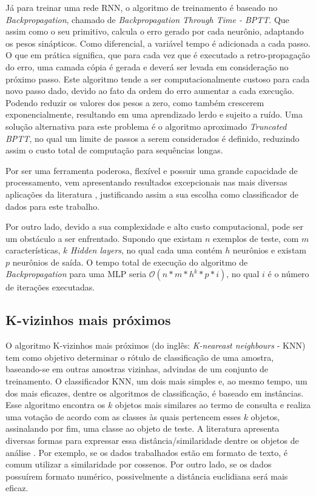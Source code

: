 Já para treinar uma rede RNN, o algoritmo de treinamento é baseado no \textit{Backpropagation}, chamado de \textit{Backpropagation Through Time - BPTT}. Que assim como o seu primitivo, calcula o erro gerado por cada neurônio, adaptando os pesos sinápticos. Como diferencial, a variável tempo é adicionada a cada passo. O que em prática significa, que para cada vez que é executado a retro-propagação do erro, uma camada cópia é gerada e deverá ser levada em consideração no próximo passo. Este algoritmo tende a ser computacionalmente custoso para cada novo passo dado, devido ao fato da ordem do erro aumentar a cada execução. Podendo reduzir os valores dos pesos a zero, como também crescerem exponencialmente, resultando em uma aprendizado lerdo e sujeito a ruído. Uma solução alternativa para este problema é o algoritmo aproximado \textit{Truncated BPTT}, no qual um limite de passos a serem considerados é definido, reduzindo assim o custo total de computação para sequências longas.
 
Por ser uma ferramenta poderosa, flexível e possuir uma grande capacidade de processamento, vem apresentando resultados excepcionais nas mais diversas aplicações da literatura \citep{gupta2018text, martin2018speech, bishop2006pattern, duda1973pattern, Rauber2005}, justificando assim a sua escolha como classificador de dados para este trabalho. 

Por outro lado, devido a sua complexidade e alto custo computacional, pode ser um obstáculo a ser enfrentado. Supondo que existam $n$ exemplos de teste, com $m$ características, $k$ \textit{Hidden layers}, no qual cada uma contém $h$ neurônios e existam $p$ neurônios de saída. O tempo total de execução do algoritmo de \textit{Backpropagation} para uma MLP seria $\mathcal{O}(n*m*h^{k}*p*i)$, no qual $i$ é o número de iterações executadas.

\subsection{K-vizinhos mais próximos}
O algoritmo K-vizinhos mais próximos (do inglês: \textit{K-neareast neighbours} - KNN) tem como objetivo determinar o rótulo de classificação de uma amostra, baseando-se em outras amostras vizinhas, advindas de um conjunto de treinamento. O classificador KNN, um dois mais simples e, ao mesmo tempo, um dos mais eficazes, dentre os algoritmos de classificação, é baseado em instâncias. Esse algoritmo encontra os $k$ objetos mais similares ao termo de consulta e realiza uma votação de acordo com as classes às quais pertencem esses $k$ objetos, assinalando por fim, uma classe ao objeto de teste. A literatura apresenta diversas formas para expressar essa distância/similaridade dentre os objetos de análise \citep{fukunaga1975knn, duda1973pattern}. Por exemplo, se os dados trabalhados estão em formato de texto, é comum utilizar a similaridade por cossenos. Por outro lado, se os dados possuírem formato numérico, possivelmente a distância euclidiana será mais eficaz.

